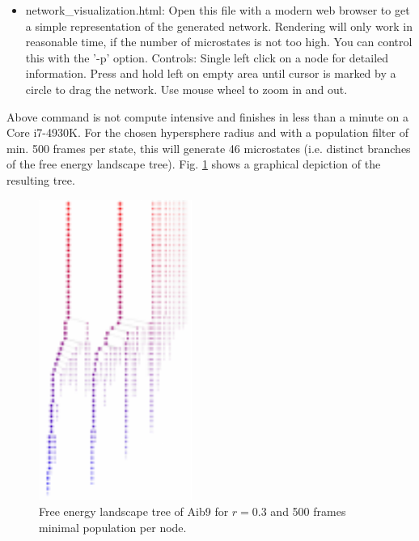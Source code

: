 \documentclass[12pt,a4paper,twoside,english,fleqn]{article}
\begin{document}
\begin{itemize}
  \item network\_visualization.html: Open this file with a modern web browser
                                     to get a simple representation of the
                                     generated network. Rendering will only
                                     work in reasonable time, if the number of
                                     microstates is not too high. You can
                                     control this with the '-p' option.
                                     Controls: Single left click on a node for
                                     detailed information. Press and hold left
                                     on empty area until cursor is marked by a
                                     circle to drag the network.
                                     Use mouse wheel to zoom in and out.
\end{itemize}


\begin{mdframed}[innertopmargin=20pt]
  Above command is not compute intensive and finishes in less than a minute
  on a Core i7-4930K.
  For the chosen hypersphere radius and with a population filter of min. 500
  frames per state, this will generate 46 microstates (i.e. distinct branches
  of the free energy landscape tree).
  Fig. \ref{fig:fel_tree} shows a graphical depiction of the resulting tree.
\end{mdframed}

\begin{figure}
  \centerline{
    \includegraphics[width=5cm] {fel_tree}}
  \caption{\label{fig:fel_tree}
    Free energy landscape tree of Aib9 for $r=0.3$ and 500 frames minimal
    population per node.}
\end{figure}
\end{document}
